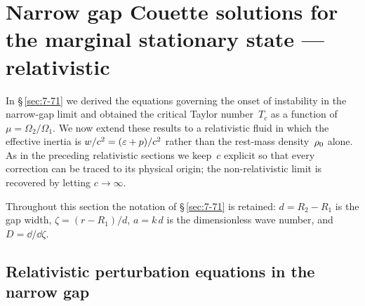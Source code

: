 %
%

\section{Narrow gap Couette solutions for the marginal stationary
state --- relativistic}\label{sec:rel-71}

In \S\,\ref{sec:7-71} we derived the equations governing the onset of
instability in the narrow-gap limit and obtained the critical Taylor
number~$T_{c}$ as a function of~$\mu = \Omega_{2}/\Omega_{1}$.  We now
extend these results to a relativistic fluid in which the effective
inertia is $w/c^{2} = (\varepsilon + p)/c^{2}$ rather than the
rest-mass density~$\rho_0$ alone.  As in the preceding relativistic
sections we keep~$c$ explicit so that every correction can be traced to
its physical origin; the non-relativistic limit is recovered by
letting $c \to \infty$.

Throughout this section the notation of \S\,\ref{sec:7-71} is retained:
$d = R_{2} - R_{1}$ is the gap width,
$\zeta = (r - R_{1})/d$,
$a = k\,d$ is the dimensionless wave number, and
$D = \dd/\dd\zeta$.

\subsection{Relativistic perturbation equations in the narrow gap}
\label{sec:rel-71-equations}

